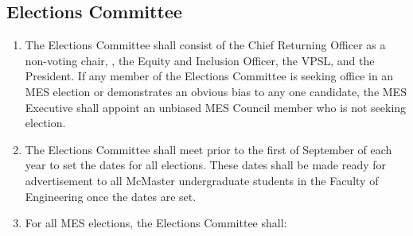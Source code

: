 \hypertarget{elections-committee}{%
 \subsection{Elections Committee}
 \label{elections-committee}}
\begin{enumerate}
 \item
  The Elections Committee shall consist of the Chief Returning Officer
  as a non-voting chair, , the Equity and Inclusion Officer, the VPSL,
  and the President. If any member of the Elections Committee is seeking
  office in an MES election or demonstrates an obvious bias to any one
  candidate, the MES Executive shall appoint an unbiased MES Council
  member who is not seeking election.
 \item
  The Elections Committee shall meet prior to the first of September of
  each year to set the dates for all elections. These dates shall be
  made ready for advertisement to all McMaster undergraduate students in
  the Faculty of Engineering once the dates are set.
 \item
  For all MES elections, the Elections Committee shall:


\end{enumerate}
